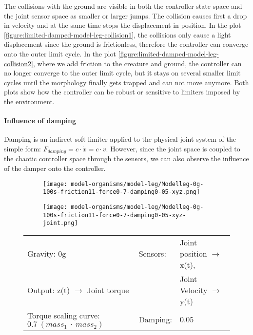 \documentclass[main]{subfiles}
\begin{document}
The collisions with the ground are visible in both the controller state space and the joint sensor space as smaller or larger jumps. %
%
The collision causes first a drop in velocity and at the same time stops the displacement in position. %
%
In the plot \ref{figure:limited-damped-model-leg-collision1}, the collisions only cause a light displacement since the ground is frictionless, therefore the controller can converge onto the outer limit cycle. %
%
In the plot \ref{figure:limited-damped-model-leg-collision2}, where we add friction to the creature and ground, the controller can no longer converge to the outer limit cycle, but it stays on several smaller limit cycles until the morphology finally gets trapped and can not move anymore. %
%
Both plots show how the controller can be robust or sensitive to limiters imposed by the environment.

\paragraph{Influence of damping} Damping is an indirect soft limiter applied to the physical joint system of the simple form: \(F_{damping} = c \cdot \dot{x} = c \cdot v\). %
%
However, since the joint space is coupled to the chaotic controller space through the sensors, we can also observe the influence of the damper onto the controller.

\begin{figure}[H]
	\centering
		\begin{subfigure}[c]{0.45\textwidth}
	\texttt{[image: model-organisms/model-leg/Modelleg-0g-100s-friction11-force0-7-damping0-05-xyz.png]}
		\end{subfigure}
	\begin{subfigure}[c]{0.45\textwidth}
	\texttt{[image: model-organisms/model-leg/Modelleg-0g-100s-friction11-force0-7-damping0-05-xyz-joint.png]}
		\end{subfigure}
	\caption[Limited chaotic controller controlling model leg]{}
	\begin{tabular}{l|ll}
	\hline 
	Gravity: 0g  & Sensors: & Joint position \(\rightarrow\) x(t),\\
	 Output: z(t) \(\rightarrow\) Joint torque & & Joint Velocity \(\rightarrow\) y(t) \\
	  Torque scaling curve: \(0.7~(mass_1~\cdot~mass_2)\) & Damping: & 0.05 \\
	  \hline
	\end{tabular}

	\label{figure:limited-damped-model-leg-damping1}
\end{figure}
\end{document}
